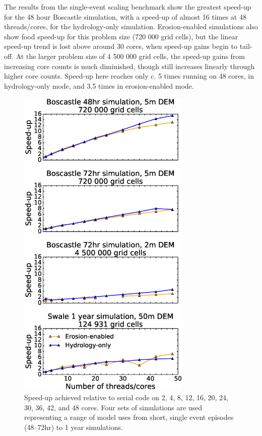 The results from the single-event scaling benchmark show the greatest speed-up for the 48 hour Boscastle simulation, with a speed-up of almost 16 times at 48 threads/cores, for the hydrology-only simulation. Erosion-enabled simulations also show food speed-up for this problem size (720 000 grid cells), but the linear speed-up trend is lost above around 30 cores, when speed-up gains begin to tail-off. At the larger problem size of 4 500 000 grid cells, the speed-up gains from increasing core counts is much diminished, though still increases linearly through higher core counts. Speed-up here reaches only c. 5 times running on 48 cores, in hydrology-only mode, and 3.5 times in erosion-enabled mode.

\begin{figure}[t]
\includegraphics[width=8.3cm]{chp05_figures_scripts/strong_scale_four.eps}
\caption{Speed-up achieved relative to serial code on 2, 4, 8, 12, 16, 20, 24, 30, 36, 42, and 48 cores. Four sets of simulations are used representing a range of model uses from short, single event episodes (48--72hr) to 1 year simulations.}
\label{fig_strong_scale_multi}
\end{figure}

